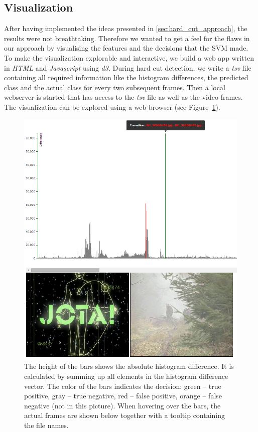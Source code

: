 \subsection{Visualization}
\label{sec:hard_cut_visualization}

After having implemented the ideas presented in \ref{sec:hard_cut_approach}, the results were not breathtaking.
Therefore we wanted to get a feel for the flaws in our approach by visualising the features and the decisions that the SVM made.
To make the visualization explorable and interactive, we build a web app written in \emph{HTML} and \emph{Javascript} using \emph{d3}.
During hard cut detection, we write a \emph{tsv} file containing all required information like the histogram differences, the predicted class and the actual class for every two subsequent frames.
Then a local webserver is started that has access to the \emph{tsv} file as well as the video frames.
The visualization can be explored using a web browser (see Figure~\ref{fig:hard_cut_visualization}).

\begin{figure}
	\centering
	\includegraphics[scale=.7]{images/hard_cut_visualization.png}
	\caption{The height of the bars shows the absolute histogram difference.
    It is calculated by summing up all elements in the histogram difference vector.
    The color of the bars indicates the decision: green -- true positive, gray -- true negative, red -- false positive, orange -- false negative (not in this picture).
    When hovering over the bars, the actual frames are shown below together with a tooltip containing the file names.}
	\label{fig:hard_cut_visualization}
\end{figure}

